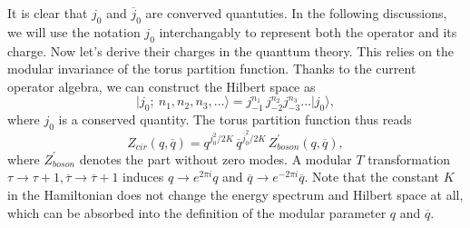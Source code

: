 It is clear that $j_0$ and $\overline{j}_0$ are converved quantuties. In the following discussions, we will use the notation $j_0$ interchangably to represent both the operator and its charge. Now let's derive their charges in the quanttum theory. This relies on the modular invariance of the torus partition function. Thanks to the current operator algebra, we can construct the Hilbert space as
\begin{equation}
	\vert j_0;\ n_1, n_2,n_3,\dots \rangle = j_{-1}^{n_1}\,j_{-2}^{n_2} j_{-3}^{n_3} \dots \vert j_0\rangle, 
\end{equation}
where $j_0$ is a conserved quantity. The torus partition function thus reads
\begin{equation}
	Z_{cir}(q,\overline{q}) = q^{j_0^2/2K} \, \overline{q}^{\overline{j}_0^2/2K} \, Z^{\prime}_{boson} (q,\overline{q}),
\end{equation}
where $Z^\prime_{boson}$ denotes the part without zero modes. A modular $T$ transformation $\tau \rightarrow \tau + 1, \overline{\tau} \rightarrow \overline{\tau} + 1$ induces $q \rightarrow e^{2\pi i}q$ and $\overline{q} \rightarrow e^{-2\pi i}\overline{q}$. Note that the constant $K$ in the Hamiltonian does not change the energy spectrum and Hilbert space at all, which can be absorbed into the definition of the modular parameter $q$ and $\overline{q}$. 

